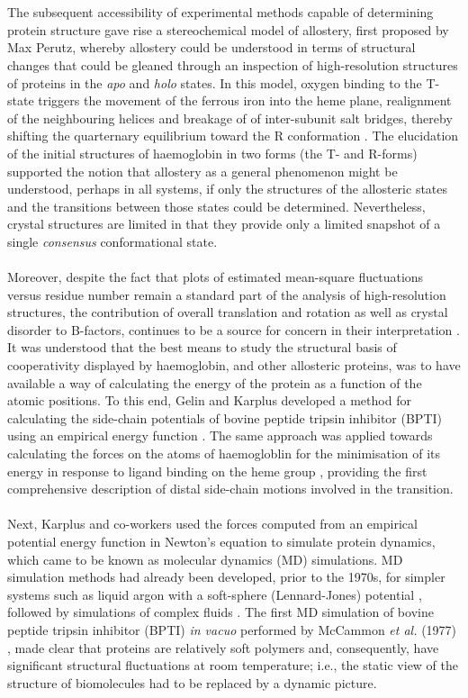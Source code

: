 %
%
\\\\
%
%
The subsequent accessibility of experimental methods capable of determining protein structure gave rise a stereochemical model of allostery, first proposed by Max Perutz, whereby allostery could be understood in terms of structural changes that could be gleaned through an inspection of high-resolution structures of proteins in the \textit{apo} and \textit{holo} states. In this model, oxygen binding to the T-state triggers the movement of the ferrous iron into the heme plane, realignment of the neighbouring helices and breakage of of inter-subunit salt bridges, thereby shifting the quarternary equilibrium toward the R conformation \cite{Perutz:1970aa}. The elucidation of the initial structures of haemoglobin in two forms (the T- and R-forms) supported the notion that allostery as a general phenomenon might be understood, perhaps in all systems, if only the structures of the allosteric states and the transitions between those states could be determined. Nevertheless, crystal structures are limited in that they provide only a limited snapshot of a single \textit{consensus} conformational state.
%
%
\\\\
%
%
Moreover, despite the fact that plots of estimated mean-square fluctuations versus residue number remain a standard part of the analysis of high-resolution structures, the contribution of overall translation and rotation as well as crystal disorder to B-factors, continues to be a source for concern in their interpretation \cite{Karplus:2002aa}. It was understood that the best means to study the structural basis of cooperativity displayed by haemoglobin, and other allosteric proteins, was to have available a way of calculating the energy of the protein as a function of the atomic positions. To this end, Gelin and Karplus developed a method for calculating the side-chain potentials of bovine peptide tripsin inhibitor (BPTI) using an empirical energy function \cite{Gelin:1975aa}. The same approach was applied towards calculating the forces on the atoms of haemogloblin for the minimisation of its energy in response to ligand binding on the heme group \cite{Gelin:1977aa}, providing the first comprehensive description of distal side-chain motions involved in the transition. 
%
%
\\\\
%
%
Next, Karplus and co-workers used the forces computed from an empirical potential energy function in Newton's equation to simulate protein dynamics, which came to be known as molecular dynamics (MD) simulations. MD simulation methods had already been developed, prior to the 1970s, for simpler systems such as liquid argon with a soft-sphere (Lennard-Jones) potential \cite{Rahman1964aa}, followed by simulations of complex fluids \cite{Stillinger1974aa}. The first MD simulation of bovine peptide tripsin inhibitor (BPTI) \textit{in vacuo} performed by McCammon \textit{et al.} (1977) \cite{McCammon:1977aa}, made clear that proteins are relatively soft polymers and, consequently, have significant structural fluctuations at room temperature; i.e., the static view of the structure of biomolecules had to be replaced by a dynamic picture.
